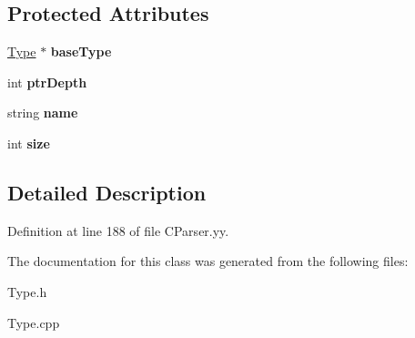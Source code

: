\subsection*{Protected Attributes}
\begin{DoxyCompactItemize}
\item 
\hypertarget{classPointerType_a6b90a7eaa7d7887f2e3351c508c618af}{\hyperlink{classType}{Type} $\ast$ {\bfseries base\-Type}}\label{classPointerType_a6b90a7eaa7d7887f2e3351c508c618af}

\item 
\hypertarget{classPointerType_acae06a11545eafb06ea7cfba23529baa}{int {\bfseries ptr\-Depth}}\label{classPointerType_acae06a11545eafb06ea7cfba23529baa}

\item 
\hypertarget{classType_ad7eeefba3dfcecbdaa98d46aaa84e389}{string {\bfseries name}}\label{classType_ad7eeefba3dfcecbdaa98d46aaa84e389}

\item 
\hypertarget{classType_a871302dc63ac1a37c0b6a225cf82048d}{int {\bfseries size}}\label{classType_a871302dc63ac1a37c0b6a225cf82048d}

\end{DoxyCompactItemize}


\subsection{Detailed Description}


Definition at line 188 of file C\-Parser.\-yy.



The documentation for this class was generated from the following files\-:\begin{DoxyCompactItemize}
\item 
Type.\-h\item 
Type.\-cpp\end{DoxyCompactItemize}
